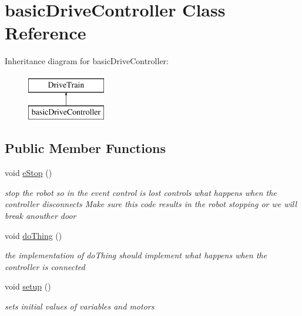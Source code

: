 \hypertarget{classbasic_drive_controller}{}\section{basic\+Drive\+Controller Class Reference}
\label{classbasic_drive_controller}
Inheritance diagram for basic\+Drive\+Controller\+:\begin{figure}[H]
\begin{center}
\leavevmode
\includegraphics[height=2.000000cm]{classbasic_drive_controller}
\end{center}
\end{figure}
\subsection*{Public Member Functions}
\begin{DoxyCompactItemize}
\item 
\mbox{\label{classbasic_drive_controller_a38fd1018f8871353019bb00ecb5e99d9}} 
void \mbox{\hyperlink{classbasic_drive_controller_a38fd1018f8871353019bb00ecb5e99d9}{e\+Stop}} ()
\begin{DoxyCompactList}\small\item\em stop the robot so in the event control is lost controls what happens when the controller disconnects Make sure this code results in the robot stopping or we will break anouther door \end{DoxyCompactList}\item 
\mbox{\label{classbasic_drive_controller_ae1469e58a39e844f0b68b91328252fc0}} 
void \mbox{\hyperlink{classbasic_drive_controller_ae1469e58a39e844f0b68b91328252fc0}{do\+Thing}} ()
\begin{DoxyCompactList}\small\item\em the implementation of do\+Thing should implement what happens when the controller is connected \end{DoxyCompactList}\item 
\mbox{\label{classbasic_drive_controller_a6b6ba001d4ff8de03c04646012df97a1}} 
void \mbox{\hyperlink{classbasic_drive_controller_a6b6ba001d4ff8de03c04646012df97a1}{setup}} ()
\begin{DoxyCompactList}\small\item\em sets initial values of variables and motors \end{DoxyCompactList}\end{DoxyCompactItemize}

